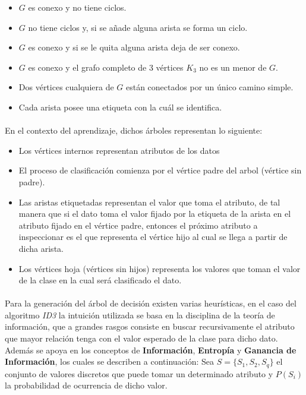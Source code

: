 \documentclass[10pt, a4paper,spanish]{article}
\begin{document}
 		\begin{itemize}
			\setlength\itemsep{0em}
 			\item $G$ es conexo y no tiene ciclos.
			\item $G$ no tiene ciclos y, si se añade alguna arista se forma un ciclo.
			\item $G$ es conexo y si se le quita alguna arista deja de ser conexo.
			\item $G$ es conexo y el grafo completo de 3 vértices $K_{3}$ no es un menor de $G$.
			\item Dos vértices cualquiera de $G$ están conectados por un único camino simple.
			\item Cada arista posee una etiqueta con la cuál se identifica.
 		\end{itemize}

		\paragraph{}
		En el contexto del aprendizaje, dichos árboles representan lo siguiente:

		\begin{itemize}
			\setlength\itemsep{0em}
			\item Los vértices internos representan atributos de los datos
			\item El proceso de clasificación comienza por el vértice padre del arbol (vértice sin padre).
			\item Las aristas etiquetadas representan el valor que toma el atributo, de tal manera que si el dato toma el valor fijado por la etiqueta de la arista en el atributo fijado en el vértice padre, entonces el próximo atributo a inspeccionar es el que representa el vértice hijo al cual se llega a partir de dicha arista.
			\item Los vértices hoja (vértices sin hijos) representa los valores que toman el valor de la clase en la cual será clasificado el dato.
 		\end{itemize}

		\paragraph{}
		Para la generación del árbol de decisión existen varias heurísticas, en el caso del algoritmo \emph{ID3} la intuición utilizada se basa en la disciplina de la teoría de información, que a grandes rasgos consiste en buscar recursivamente el atributo que mayor relación tenga con el valor esperado de la clase para dicho dato. Además se apoya en los conceptos de \textbf{Información}, \textbf{Entropía} y \textbf{Ganancia de Información}, los cuales se describen a continuación: Sea $S = \{ S_1, S_2, S_q \}$ el conjunto de valores discretos que puede tomar un determinado atributo y $P(S_i)$ la probabilidad de ocurrencia de dicho valor.
\end{document}
